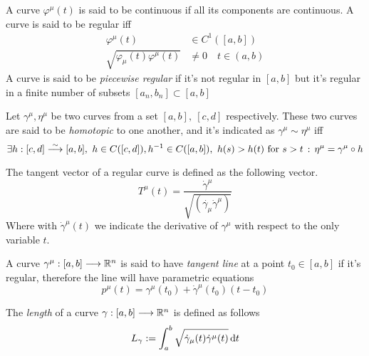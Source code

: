 \documentclass[../complete.tex]{subfiles}
\begin{document}
\begin{dfn}
	A curve $\varphi^\mu(t)$ is said to be continuous if all its components are continuous. A curve is said to be regular iff
	\begin{equation}
		\begin{aligned}
			\varphi^\mu(t)&\in C^1([a,b])\\
			\sqrt{\varphi_\mu(t)\varphi^\mu(t)}&\ne0\quad t\in(a,b)
		\end{aligned}
		\label{eq:regularity}
	\end{equation}
	A curve is said to be \textit{piecewise regular} if it's not regular in $[a,b]$ but it's regular in a finite number of subsets $[a_n,b_n]\subset[a,b]$
\end{dfn}
\begin{dfn}
	Let $\gamma^\mu,\eta^\mu$ be two curves from a set $[a,b],\ [c,d]$ respectively. These two curves are said to be \textit{homotopic} to one another, and it's indicated as $\gamma^\mu\sim\eta^\mu$ iff
	\begin{equation}
		\exists h:[c,d]\fto[\sim][a,b],\ h\in C([c,d]),h^{-1}\in C([a,b]),\ h(s)>h(t)\text{ for }s>t\st\eta^\mu=\gamma^\mu\circ h
		\label{eq:homotopy}
	\end{equation}
\end{dfn}
\begin{dfn}
	The tangent vector of a regular curve is defined as the following vector.
	\begin{equation}
		T^\mu(t)=\frac{\dot{\gamma}^\mu}{\sqrt{(\dot{\gamma_\mu}\dot{\gamma}^\mu)}}
		\label{eq:tangentvector}
	\end{equation}
	Where with $\dot{\gamma}^\mu(t)$ we indicate the derivative of $\gamma^\mu$ with respect to the only variable $t$.
\end{dfn}
\begin{dfn}
	A curve $\gamma^\mu:[a,b]\overset{}{\longrightarrow}\mathbb{R}^n$ is said to have \textit{tangent line} at a point $t_0\in[a,b]$ if it's regular, therefore the line will have parametric equations
	\begin{equation}
		p^\mu(t)=\gamma^\mu(t_0)+\dot{\gamma}^\mu(t_0)(t-t_0)
		\label{eq:curvetanline}
	\end{equation}
\end{dfn}
\begin{dfn}
	The \textit{length} of a curve $\gamma:[a,b]\overset{}{\longrightarrow}\mathbb{R}^n$ is defined as follows
	\begin{equation}
		L_\gamma:=\int_{a}^{b}\sqrt{\dot{\gamma}_\mu(t)\dot{\gamma}^\mu(t)}\diff{t}
		\label{eq:lengthcurve}
	\end{equation}
\end{dfn}
\end{document}
